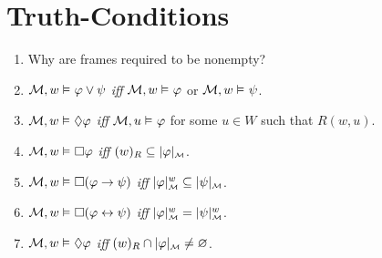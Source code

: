 \documentclass[a4paper, 11pt]{article}                  %
\begin{document}

\section{Truth-Conditions}

\begin{enumerate}

	\item Why are frames required to be nonempty?

	\item $\M, w \MLmodels[] \metaA \vee \metaB$ \textit{iff} $\M, w \MLmodels \metaA$ or $\M, w \MLmodels \metaB$.

	\item $\M, w \MLmodels[] \Diamond\metaA$ \textit{iff} $\M, u \MLmodels \metaA$ for some $u \in W$ such that $R(w, u)$.

	\item $\M, w \MLmodels[] \Box\metaA$ \textit{iff} $(w)_R \subseteq \interpret{\M}{\metaA}$.

	\item $\M, w \MLmodels[] \Box(\metaA \rightarrow \metaB)$ \textit{iff} $\interpret{\M}{\metaA}^w \subseteq \interpret{\M}{\metaB}$.

	\item $\M, w \MLmodels[] \Box(\metaA \leftrightarrow \metaB)$ \textit{iff} $\interpret{\M}{\metaA}^w = \interpret{\M}{\metaB}^w$.

	\item $\M, w \MLmodels[] \Diamond\metaA$ \textit{iff} $(w)_R \cap \interpret{\M}{\metaA} \neq \varnothing$.

\end{enumerate}
\end{document}
